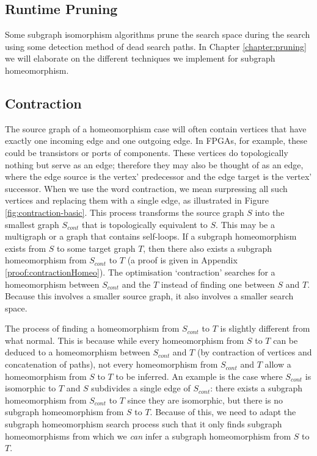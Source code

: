 \subsection{Runtime Pruning}
Some subgraph isomorphism algorithms\cite{Cordella2004, McCreesh2015} prune the search space during the search using some detection method of dead search paths. In Chapter \ref{chapter:pruning} we will elaborate on the different techniques we implement for subgraph homeomorphism.

\subsection{Contraction}
The source graph of a homeomorphism case will often contain vertices that have exactly one incoming edge and one outgoing edge. In FPGAs, for example, these could be transistors or ports of components. These vertices do topologically nothing but serve as an edge; therefore they may also be thought of as an edge, where the edge source is the vertex' predecessor and the edge target is the vertex' successor. When we use the word contraction, we mean surpressing all such vertices and replacing them with a single edge, as illustrated in Figure \ref{fig:contraction-basic}. This process transforms the source graph $S$ into the smallest graph $S_{cont}$ that is topologically equivalent to $S$. This may be a multigraph or a graph that contains self-loops. If a subgraph homeomorphism exists from $S$ to some target graph $T$, then there also exists a subgraph homeomorphism from $S_{cont}$ to $T$ (a proof is given in Appendix \ref{proof:contractionHomeo}). The optimisation `contraction' searches for a homeomorphism between $S_{cont}$ and the $T$ instead of finding one between $S$ and $T$. Because this involves a smaller source graph, it also involves a smaller search space.

The process of finding a homeomorphism from $S_{cont}$ to $T$ is slightly different from what normal. This is because while every homeomorphism from $S$ to $T$ can be deduced to a homeomorphism between $S_{cont}$ and $T$ (by contraction of vertices and concatenation of paths), not every homeomorphism from $S_{cont}$ and $T$ allow a homeomorphism from $S$ to $T$ to be inferred. An example is the case where $S_{cont}$ is isomorphic to $T$ and $S$ subdivides a single edge of $S_{cont}$: there exists a subgraph homeomorphism from $S_{cont}$ to $T$ since they are isomorphic, but there is no subgraph homeomorphism from $S$ to $T$. Because of this, we need to adapt the subgraph homeomorphism search process such that it only finds subgraph homeomorphisms from which we \textit{can} infer a subgraph homeomorphism from $S$ to $T$.

